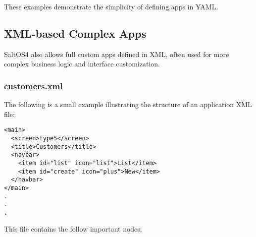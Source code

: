 \documentclass[a4paper]{article}
\begin{document}
These examples demonstrate the simplicity of defining apps in YAML.

\hypertarget{toc53}{}
\subsection{XML-based Complex Apps}

SaltOS4 also allows full custom apps defined in XML, often used for more complex business logic and interface customization.

\hypertarget{toc54}{}
\subsubsection{customers.xml}

The following is a small example illustrating the structure of an application XML file:

\begin{lstlisting}
<main>
  <screen>type5</screen>
  <title>Customers</title>
  <navbar>
    <item id="list" icon="list">List</item>
    <item id="create" icon="plus">New</item>
  </navbar>
</main>
.
.
.
\end{lstlisting}

This file contains the follow important nodes:
\end{document}
